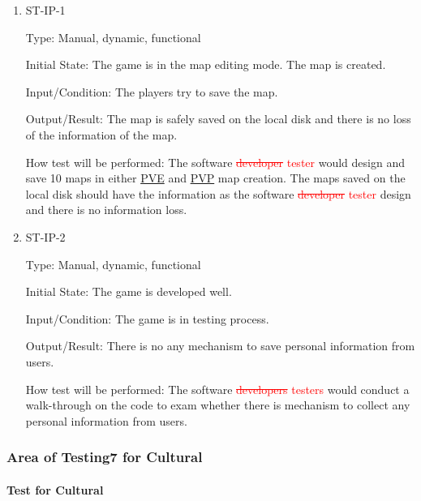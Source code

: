 \documentclass[12pt, titlepage]{article}
\begin{document}
\begin{enumerate}

\item{ST-IP-1\\}

Type: Manual, dynamic, functional
					
Initial State: The game is in the map editing mode. The map is created.
					
Input/Condition: The players try to save the map.
					
Output/Result: The map is safely saved on the local disk and there is no loss of the information of the map.
					
How test will be performed: The software  \textcolor{red}{\sout{developer} tester} would design and save 10 maps in either \underline{PVE} and \underline{PVP} map creation. The maps saved on the local disk should have the information as the software  \textcolor{red}{\sout{developer} tester} design and there is no information loss.

\item{ST-IP-2\\}

Type: Manual, dynamic, functional
					
Initial State: The game is developed well.
					
Input/Condition: The game is in testing process.
					
Output/Result: There is no any mechanism to save personal information from users.
					
How test will be performed: The software \textcolor{red}{\sout{developers} testers} would conduct a walk-through on the code to exam whether there is mechanism to collect any personal information from users. 


\end{enumerate}

\subsubsection{Area of Testing7 for Cultural}
\paragraph{Test for Cultural}
\end{document}
